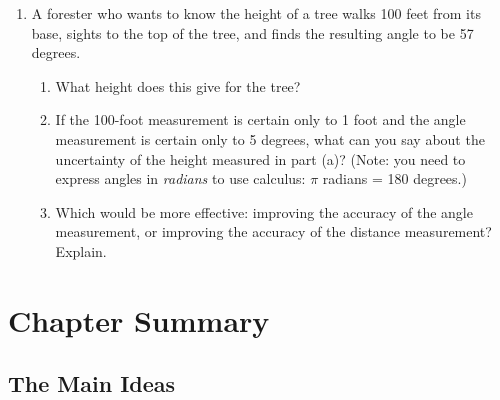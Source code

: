 \begin{enumerate}
\begin{enumerate}
  \item Each typical person added to the work force increases the monthly
labor expense by \$1,500.  Estimate what happens to the monthly profit
if one more person is added to the work force.  What, therefore, is
the rate of change of profit, in thousands of dollars per person?  Is
the rate positive or negative?

  \item Suppose managers respond to increased demand for the product by
adding three workers to the labor force.  What does that do to monthly
profit?  If the managers want to keep the profit level unchanged, they
could try to alter capital expenses.  What change in $K$ would leave
profit unchanged after the three workers are added?  (This is called a

{\bf trade-off}.)\label{trade off}



\end{enumerate}
\item A forester who wants to know the height of a tree walks 100 feet
from its base, sights to the top of the tree, and finds the resulting
angle to be 57 degrees.

  \begin{enumerate}
  \item What height does this give for the tree?

  \item If the 100-foot measurement is certain only to 1 foot and the
angle measurement is certain only to 5 degrees, what can you say about
the uncertainty of the height measured in part (a)?  (Note: you need
to express angles in {\em radians\/} to use calculus: $\pi$ radians =
180 degrees.)


  \item Which would be more effective: improving the accuracy of the
angle measurement, or improving the accuracy of the distance
measurement?  Explain.




\end{enumerate}
\end{enumerate}
\section{Chapter Summary} 
\label{sec:chapter-summary}

\subsection{The Main Ideas}
\label{subsec:the-main-ideas}

